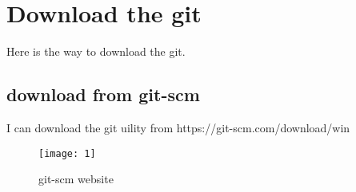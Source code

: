 \chapter{Download the git}\label{ch:introduction}
Here is the way to download the git.

\section{download from git-scm}
I can download the git uility from https://git-scm.com/download/win
\begin{figure} [!h]
\centering
\texttt{[image: 1]}
\caption{git-scm website}
\label{fig:1}
\end{figure}
